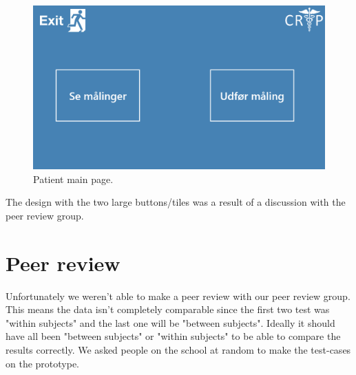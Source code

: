 \begin{figure}[H]
\centering
\includegraphics[width=.7\textwidth]{billeder/usermainpage_hifi.png}
\caption{Patient main page.}
\end{figure}

The design with the two large buttons/tiles was a result of a discussion with the peer review group.\\
\section{Peer review}
Unfortunately we weren't able to make a peer review with our peer review group. This means the data isn't completely comparable since the first two test was "within subjects" and the last one will be "between subjects". Ideally it should have all been "between subjects" or "within subjects" to be able to compare the results correctly. We asked people on the school at random to make the test-cases on the prototype.

